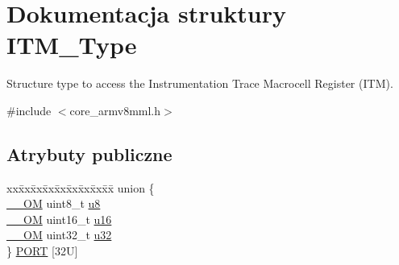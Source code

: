 \hypertarget{struct_i_t_m___type}{}\section{Dokumentacja struktury I\+T\+M\+\_\+\+Type}
\label{struct_i_t_m___type}


Structure type to access the Instrumentation Trace Macrocell Register (I\+TM).  




{\ttfamily \#include $<$core\+\_\+armv8mml.\+h$>$}

\subsection*{Atrybuty publiczne}
\begin{DoxyCompactItemize}
\item 
\begin{tabbing}
xx\=xx\=xx\=xx\=xx\=xx\=xx\=xx\=xx\=\kill
union \{\\
\>\hyperlink{core__sc300_8h_a0ea2009ed8fd9ef35b48708280fdb758}{\_\_OM} uint8\_t \hyperlink{struct_i_t_m___type_ae773bf9f9dac64e6c28b14aa39f74275}{u8}\\
\>\hyperlink{core__sc300_8h_a0ea2009ed8fd9ef35b48708280fdb758}{\_\_OM} uint16\_t \hyperlink{struct_i_t_m___type_a962a970dfd286cad7f8a8577e87d4ad3}{u16}\\
\>\hyperlink{core__sc300_8h_a0ea2009ed8fd9ef35b48708280fdb758}{\_\_OM} uint32\_t \hyperlink{struct_i_t_m___type_a5834885903a557674f078f3b71fa8bc8}{u32}\\
\} \hyperlink{struct_i_t_m___type_a7010d53d9f2b725fba177015cbdc6bc2}{PORT} \mbox{[}32U\mbox{]}\\


\end{tabbing}
\end{DoxyCompactItemize}
